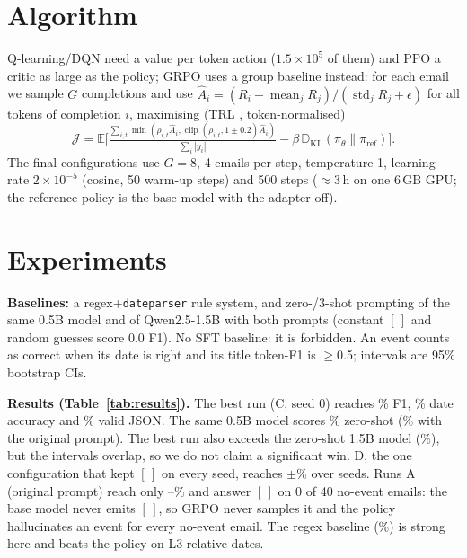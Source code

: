 \documentclass[conference,10pt]{IEEEtran}
\begin{document}
\section{Algorithm}
Q-learning/DQN need a value per token action ($1.5{\times}10^5$ of them) and PPO a critic as large as the policy;
GRPO \cite{shao2024deepseekmath} uses a group baseline instead: for each email we sample $G$ completions and use
$\hat A_i=(R_i-\operatorname{mean}_j R_j)/(\operatorname{std}_j R_j+\epsilon)$ for all tokens of completion $i$,
maximising (TRL \cite{vonwerra2022trl}, token-normalised)
\begin{equation}
\mathcal J=\mathbb E\Big[\tfrac{\sum_{i,t}\min(\rho_{i,t}\hat A_i,\operatorname{clip}(\rho_{i,t},1{\pm}0.2)\hat A_i)}{\sum_i|y_i|}-\beta\,\mathbb D_{\text{KL}}(\pi_\theta\|\pi_{\text{ref}})\Big].
\end{equation}
The final configurations use $G{=}8$, 4 emails per step, temperature 1, learning rate $2{\times}10^{-5}$ (cosine, 50
warm-up steps) and 500 steps ($\approx$3\,h on one 6\,GB GPU; the reference policy is the base model with the adapter off).

\section{Experiments}\label{sec:exp}
\textbf{Baselines:} a regex+\texttt{dateparser} rule system, and zero-/3-shot prompting of the same 0.5B model and of
Qwen2.5-1.5B with both prompts (constant $[\,]$ and random guesses score 0.0 F1). No SFT baseline: it is forbidden. An event
counts as correct when its date is right and its title token-F1 is $\ge$0.5; intervals are 95\% bootstrap CIs.

\textbf{Results (Table~\ref{tab:results}).} The best run (C, seed 0) reaches \nmGrpoVFiveSZeroF\% F1, \nmGrpoVFiveSZeroDate\% date accuracy
and \nmGrpoVFiveSZeroJson\% valid JSON. The same 0.5B model scores \nmZeroshotZeroFiveBVTwoF\% zero-shot (\nmZeroshotZeroFiveBF\% with the original prompt). The best run also exceeds the zero-shot 1.5B model (\nmZeroshotOneFiveBVTwoF\%),
but the intervals overlap, so we do not claim a significant win. D, the one configuration that kept $[\,]$ on every seed, reaches \nmVSixMeanF$\pm$\nmVSixStdF\% over \nmVSixSeeds seeds.
Runs A (original prompt) reach only \nmGrpoMainSZeroF--\nmGrpoExploreSZeroF\% and answer $[\,]$ on 0 of 40 no-event emails: the base model never
emits $[\,]$, so GRPO never samples it and the policy hallucinates an event for every no-event email. The regex baseline
(\nmRuleF\%) is strong here and beats the policy on L3 relative dates.
\end{document}
